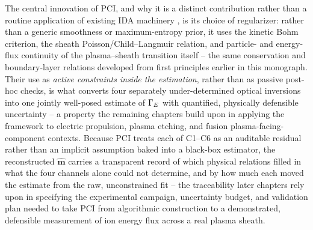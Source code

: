 The central innovation of PCI, and why it is a distinct contribution rather than a routine application of existing IDA machinery \cite{ref0707,ref0712,ref0727}, is its choice of regularizer: rather than a generic smoothness or maximum-entropy prior, it uses the kinetic Bohm criterion, the sheath Poisson/Child--Langmuir relation, and particle- and energy-flux continuity of the plasma--sheath transition itself -- the same conservation and boundary-layer relations developed from first principles earlier in this monograph. Their use as \emph{active constraints inside the estimation}, rather than as passive post-hoc checks, is what converts four separately under-determined optical inversions into one jointly well-posed estimate of $\Gamma_{E}$ with quantified, physically defensible uncertainty -- a property the remaining chapters build upon in applying the framework to electric propulsion, plasma etching, and fusion plasma-facing-component contexts. Because PCI treats each of C1--C6 as an auditable residual rather than an implicit assumption baked into a black-box estimator, the reconstructed $\hat{\mathbf m}$ carries a transparent record of which physical relations filled in what the four channels alone could not determine, and by how much each moved the estimate from the raw, unconstrained fit -- the traceability later chapters rely upon in specifying the experimental campaign, uncertainty budget, and validation plan needed to take PCI from algorithmic construction to a demonstrated, defensible measurement of ion energy flux across a real plasma sheath.
